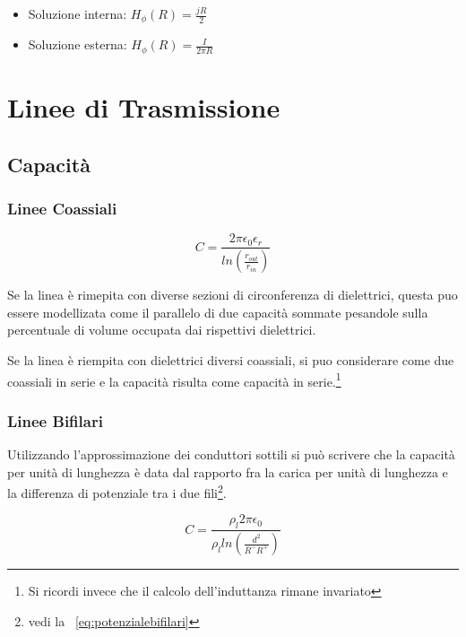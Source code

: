 \documentclass[10pt,a4paper]{report}
\begin{document}
		\begin{itemize}
		\item Soluzione interna: $H_\phi(R)=\frac{jR}{2}$ 
		\item Soluzione esterna: $H_\phi(R)=\frac{I}{2\pi R}$

		\end{itemize}

\chapter{Linee di Trasmissione}

	\section{Capacità}

	
		\subsection{Linee Coassiali}
				\begin{equation}
				C=\frac{2\pi \epsilon_0 \epsilon_r} {ln (\frac { r_{out}} {r_{in} } )}
				\end{equation}

				Se la linea è rimepita con diverse sezioni di circonferenza di dielettrici, questa puo essere modellizata come il parallelo di due capacità sommate pesandole sulla percentuale di volume occupata dai rispettivi dielettrici.
			
				Se la linea è riempita con dielettrici diversi coassiali, si puo considerare come due coassiali in serie e la capacità risulta come capacità in serie.\footnote{Si ricordi invece che il calcolo dell'induttanza rimane invariato}


		\subsection{Linee Bifilari}

			Utilizzando l'approssimazione dei conduttori sottili si può scrivere che la capacità per unità di lunghezza è data dal rapporto fra la carica per unità di lunghezza e la 
			differenza di potenziale tra i due fili\footnote{vedi la ~\ref{eq:potenzialebifilari}}.
			

			\begin{equation}
			C=\frac{\rho_l 2 \pi \epsilon_0}{\rho_l ln(\frac{d^2}{R^-R^+})}
			\label{eq:capacitabifilare}
			\end{equation}
\end{document}
